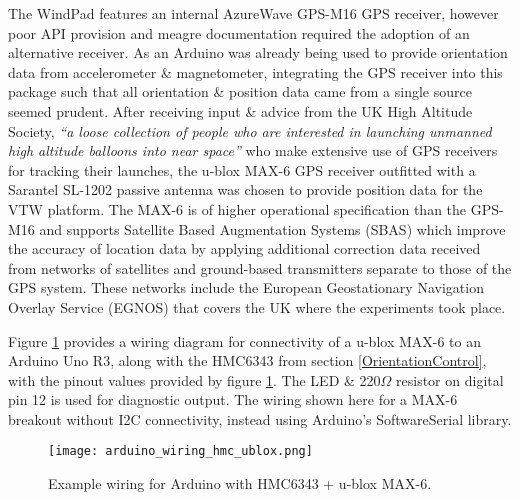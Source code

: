 The WindPad features an internal AzureWave GPS-M16 GPS receiver\azurewaveFootnote{}, however poor API provision and meagre documentation required the adoption of an alternative receiver. As an Arduino was already being used to provide orientation data from accelerometer \& magnetometer, integrating the GPS receiver into this package such that all orientation \& position data came from a single source seemed prudent. After receiving input \& advice from the UK High Altitude Society\habFootnote{}, \textit{``a loose collection of people who are interested in launching unmanned high altitude balloons into near space''} who make extensive use of GPS receivers for tracking their launches, the u-blox MAX-6\ubloxFootnote{} GPS receiver outfitted with a Sarantel SL-1202\sarantelFootnote{} passive antenna was chosen to provide position data for the VTW platform. The MAX-6 is of higher operational specification than the GPS-M16 and supports Satellite Based Augmentation Systems (SBAS) which improve the accuracy of location data by applying additional correction data received from networks of satellites and ground-based transmitters separate to those of the GPS system. These networks include the European Geostationary Navigation Overlay Service (EGNOS) that covers the UK where the experiments took place.

Figure \ref{arduino_wiring_hmc_ublox.png} provides a wiring diagram for connectivity of a u-blox MAX-6 to an Arduino Uno R3, along with the HMC6343 from section \ref{OrientationControl}, with the pinout values provided by figure \ref{arduino_wiring_hmc_ublox.png}. The LED \& 220$\Omega$ resistor on digital pin 12 is used for diagnostic output. The wiring shown here for a MAX-6 breakout without I2C connectivity, instead using Arduino's SoftwareSerial\softwareserialFootnote{} library.

\begin{figure}[h]
\centering
  \texttt{[image: arduino\_wiring\_hmc\_ublox.png]}
  \caption{Example wiring for Arduino with HMC6343 + u-blox MAX-6.}
  \label{arduino_wiring_hmc_ublox.png}
\end{figure}


